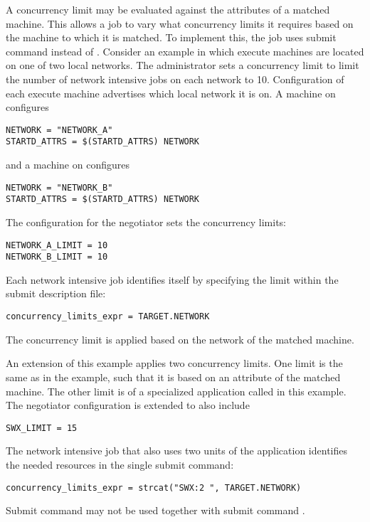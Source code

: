 A concurrency limit may be evaluated against the attributes of a 
matched machine.
This allows a job to vary what concurrency limits it requires based on
the machine to which it is matched.
To implement this, the job uses submit command 
 instead of
.
Consider an example in which execute machines are located on
one of two local networks.
The administrator sets a concurrency limit to limit the number
of network intensive jobs on each network to 10.
Configuration of each execute machine advertises which
local network it is on. 
A machine on  configures
\begin{verbatim}
NETWORK = "NETWORK_A"
STARTD_ATTRS = $(STARTD_ATTRS) NETWORK
\end{verbatim}
and a machine on  configures
\begin{verbatim}
NETWORK = "NETWORK_B"
STARTD_ATTRS = $(STARTD_ATTRS) NETWORK
\end{verbatim}

The configuration for the negotiator sets the concurrency limits:
\begin{verbatim}
NETWORK_A_LIMIT = 10
NETWORK_B_LIMIT = 10
\end{verbatim}

Each network intensive job identifies itself by specifying the limit
within the submit description file:
\begin{verbatim}
concurrency_limits_expr = TARGET.NETWORK
\end{verbatim}

The concurrency limit is applied based on the network
of the matched machine.

An extension of this example applies two concurrency limits.
One limit is the same as in the example, 
such that it is based on an attribute of the matched machine.
The other limit is of a specialized application
called  in this example.
The negotiator configuration is extended to also include
\begin{verbatim}
SWX_LIMIT = 15
\end{verbatim}

The network intensive job that also uses two units of the  
application identifies the needed resources in the single submit command:
\begin{verbatim}
concurrency_limits_expr = strcat("SWX:2 ", TARGET.NETWORK)
\end{verbatim}

Submit command  may not be used 
together with submit command .


